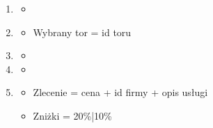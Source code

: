 \documentclass[a4paper,11pt]{article}
\begin{document}
\begin{enumerate}[label= \textbf{\Alph*}]
\begin{itemize}
    \item[]
\end{itemize}
\item \begin{itemize} %
    \item[]
\end{itemize}
\item \begin{itemize} %
    \item[]
    Wybrany tor = id toru
\end{itemize}
\item \begin{itemize} %
    \item[]
\end{itemize}
\item \begin{itemize} %
    \item[]
\end{itemize}
\item \begin{itemize} %
    \item[]
    Zlecenie = cena + id firmy + opis usługi
    \item[]
    Zniżki = 20\%|10\%
\end{itemize}
\end{enumerate}
 
 
\end{document}
